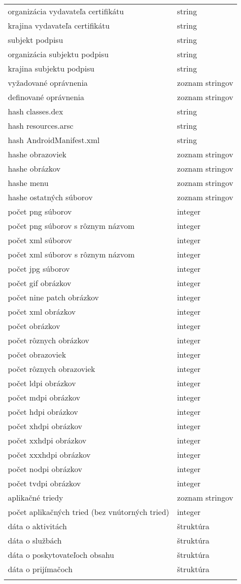 \begin{longtable}{|l|p{3.3cm}|}
organizácia vydavateľa certifikátu						& string\\
krajina vydavateľa certifikátu						& string\\
subjekt podpisu						& string\\
organizácia subjektu podpisu						& string\\
krajina subjektu podpisu						& string\\
vyžadované oprávnenia					& zoznam stringov \\
definované oprávnenia					& zoznam stringov \\
hash classes.dex						& string \\
hash resources.arsc						& string \\
hash AndroidManifest.xml				& string \\
hashe obrazoviek						& zoznam stringov \\
hashe obrázkov						& zoznam stringov \\
hashe menu						& zoznam stringov \\
hashe ostatných súborov						& zoznam stringov \\
počet png súborov							& integer \\
počet png súborov s rôznym názvom							& integer \\
počet xml súborov							& integer \\
počet xml súborov s rôznym názvom							& integer \\
počet jpg súborov 					& integer \\
počet gif obrázkov 					& integer \\
počet nine patch obrázkov 					& integer \\
počet xml obrázkov 					& integer \\
počet obrázkov 					& integer \\
počet rôznych obrázkov 					& integer \\
počet obrazoviek 					& integer \\
počet rôznych obrazoviek 					& integer \\
počet ldpi obrázkov					& integer \\
počet mdpi obrázkov 					& integer \\
počet hdpi obrázkov 					& integer \\
počet xhdpi obrázkov 					& integer \\
počet xxhdpi obrázkov 					& integer \\
počet xxxhdpi obrázkov 					& integer \\
počet nodpi obrázkov 					& integer \\
počet tvdpi obrázkov 					& integer \\
aplikačné triedy					& zoznam stringov \\
počet aplikačných tried	(bez vnútorných tried)				& integer \\
dáta o aktivitách				& štruktúra \\
dáta o službách				& štruktúra \\
dáta o poskytovateľoch obsahu				& štruktúra \\
dáta o prijímačoch				& štruktúra \\

  \label{tab:ziskaneData}
\end{longtable}